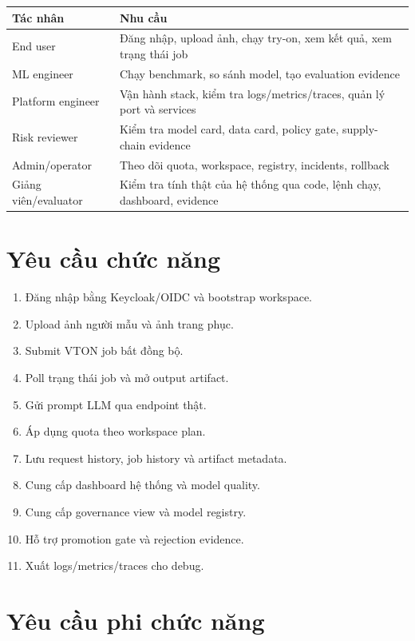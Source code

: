 \documentclass[12pt,a4paper,oneside]{report}
\begin{document}
\begin{longtable}{p{4.2cm}p{10.5cm}}
\toprule
\textbf{Tác nhân} & \textbf{Nhu cầu} \\
\midrule
End user & Đăng nhập, upload ảnh, chạy try-on, xem kết quả, xem trạng thái job \\
ML engineer & Chạy benchmark, so sánh model, tạo evaluation evidence \\
Platform engineer & Vận hành stack, kiểm tra logs/metrics/traces, quản lý port và services \\
Risk reviewer & Kiểm tra model card, data card, policy gate, supply-chain evidence \\
Admin/operator & Theo dõi quota, workspace, registry, incidents, rollback \\
Giảng viên/evaluator & Kiểm tra tính thật của hệ thống qua code, lệnh chạy, dashboard, evidence \\
\bottomrule
\end{longtable}

\section{Yêu cầu chức năng}

\begin{enumerate}
  \item Đăng nhập bằng Keycloak/OIDC và bootstrap workspace.
  \item Upload ảnh người mẫu và ảnh trang phục.
  \item Submit VTON job bất đồng bộ.
  \item Poll trạng thái job và mở output artifact.
  \item Gửi prompt LLM qua endpoint thật.
  \item Áp dụng quota theo workspace plan.
  \item Lưu request history, job history và artifact metadata.
  \item Cung cấp dashboard hệ thống và model quality.
  \item Cung cấp governance view và model registry.
  \item Hỗ trợ promotion gate và rejection evidence.
  \item Xuất logs/metrics/traces cho debug.
\end{enumerate}

\section{Yêu cầu phi chức năng}
\end{document}
